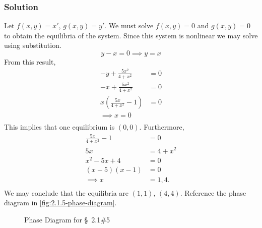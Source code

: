 \documentclass[12pt]{article}
\begin{document}
\subsubsection*{Solution}
Let $f(x,y) = x'$, $g(x,y) = y'$. We must solve $f(x,y)=0$ and $g(x,y)=0$ to
obtain the equilibria of the system. Since this system is nonlinear we may solve
using substitution.
\begin{equation}
  y - x = 0 \implies y = x
\end{equation}
From this result,
\begin{equation}
  \begin{aligned}
    -y+\frac{5x^2}{4+x^2} &= 0 \\
    -x+\frac{5x^2}{4+x^2} &= 0 \\
    x\left(\frac{5x}{4+x^2}-1 \right) &= 0 \\
    \implies x = 0 \\
\end{aligned}
\end{equation}
This implies that one equilibrium is $(0,0)$. Furthermore,
\begin{equation}
  \begin{aligned}
    \frac{5x}{4+x^2} -1 &= 0 \\
    5x &= 4+x^2 \\
    x^2-5x+4 &= 0 \\
    (x-5)(x-1) &= 0 \\
    \implies x &= 1, 4. \\
  \end{aligned}
\end{equation}
We may conclude that the equilibria are $(1,1)$, $(4,4)$. Reference the phase
diagram in \cref{fig:2.1.5-phase-diagram}. 

\begin{figure}
  \centering
  \caption{Phase Diagram for \S~2.1\#5}
  \label{fig:2.2.1a-phase-diagram}
\end{figure}
\end{document}
